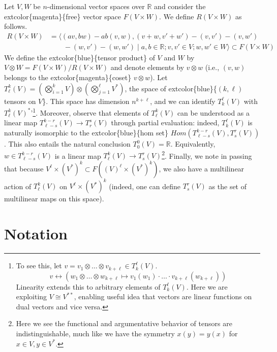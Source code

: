 \documentclass[
]{book}
\begin{document}
Let \(V,W\) be \(n\)-dimensional vector spaces over \(\mathbb{R}\) and consider the extcolor\{magenta\}\{free\} vector space \(F(V \times W)\). We define \(R(V \times W)\) as follows.\\
\begin{align*} 
    R(V \times W) &= \Big\langle (av,bw) - ab(v,w),  (v + w, v' + w') - (v,v') - (v,w') \\  
    &\qquad - (w,v') - (w,w') \; \Big| \; a,b \in \mathbb{R}; v,v' \in V; w,w' \in W \Big\rangle \subset F(V \times W) 
\end{align*}
We define the extcolor\{blue\}\{tensor product\} of \(V\) and \(W\) by \(V \otimes W = F(V \times W)/R(V \times W)\) and denote elements by \(v \otimes w\) (i.e., \((v,w)\) belongs to the extcolor\{magenta\}\{coset\} \(v \otimes w\)). Let \(T^k_\ell(V) = (\bigotimes_{i=1}^k V) \otimes (\bigotimes_{j=1}^\ell V^*)\), the space of extcolor\{blue\}\{\((k, \ell)\) tensors on \(V\)\}. This space has dimension \(n^{k + \ell}\), and we can identify \(T_k^\ell(V)\) with \(T_\ell^k(V)^*\)'\footnote{To see this, let \(v = v_1 \otimes \dots \otimes v_{k+\ell} \in T_k^\ell(V)\).
  \begin{equation}
  v \leftrightarrow (w_1 \otimes \dots \otimes w_{k+\ell} \mapsto v_1(w_1) \cdot \dotsc \cdot v_{k+\ell}(w_{k+\ell}))
  \end{equation}
  Linearity extends this to arbitrary elements of \(T_k^\ell(V)\). Here we are exploiting \(V \cong V^{**}\), enabling useful idea that vectors are linear functions on dual vectors and vice versa.}. Moreover, observe that elements of \(T^k_\ell(V)\) can be understood as a linear map \(T^{k-r}_{\ell-s}(V) \to T_r^s(V)\) through partial evaluation: indeed, \(T_k^\ell(V)\) is naturally isomorphic to the extcolor\{blue\}\{hom set\} \(Hom(T^{k-r}_{\ell-s}(V), T^r_s(V))\). This also entails the natural conclusion \(T_0^0(V) = \mathbb{R}\). Equivalently, \(w \in T^{k-r}_{\ell-s}(V)\) is a linear map \(T^k_\ell(V) \to T^r_s(V)\)\footnote{Here we see the functional and argumentative behavior of tensors are indistinguishable, much like we have the symmetry \(x(y) = y(x)\) for \(x \in V, y \in V^*\).}. Finally, we note in passing that because \(V^\ell \times (V^*)^k \subset F((V)^\ell \times (V^*)^k)\), we also have a multilinear action of \(T^k_\ell(V)\) on \(V^\ell \times (V^*)^k\) (indeed, one can define \(T^r_s(V)\) as the set of multilinear maps on this space).

\hypertarget{notation}{%
\section{Notation}\label{notation}}
\end{document}
